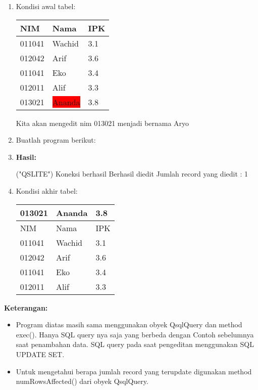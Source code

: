 \begin{enumerate}
\item Kondisi awal tabel:

\begin{tabular}{|l|l|l|}
\hline
NIM & Nama & IPK \\ \hline
011041 & Wachid & 3.1 \\ \hline
012042 & Arif & 3.6 \\ \hline
011041 & Eko & 3.4 \\ \hline
012011 & Alif & 3.3 \\ \hline
013021 & \colorbox{red}{Ananda} & 3.8 \\ \hline
\end{tabular}

Kita akan mengedit nim 013021 menjadi bernama Aryo

\item Buatlah program berikut:



\item \textbf{Hasil:}
\begin{lcverbatim}
("QSLITE")
Koneksi berhasil
Berhasil diedit
Jumlah record yang diedit : 1
\end{lcverbatim}
\item Kondisi akhir tabel:

\begin{tabular}{|l|l|l|}
\hline
013021 & Ananda & 3.8 \\ \hline
NIM & Nama & IPK \\ \hline
011041 & Wachid & 3.1 \\ \hline
012042 & Arif & 3.6 \\ \hline
011041 & Eko & 3.4 \\ \hline
012011 & Alif & 3.3 \\ \hline

\end{tabular}
\end{enumerate}

\textbf{Keterangan:}

\begin{itemize}

\item
Program diatas masih sama menggunakan obyek QsqlQuery dan method
exec(). Hanya SQL query nya saja yang berbeda dengan Contoh sebelumnya
saat penambahan data. SQL query pada saat pengeditan menggunakan SQL
UPDATE SET.
\item
Untuk mengetahui berapa jumlah record yang terupdate digunakan method
numRowsAffected() dari obyek QsqlQuery.
\end{itemize}

